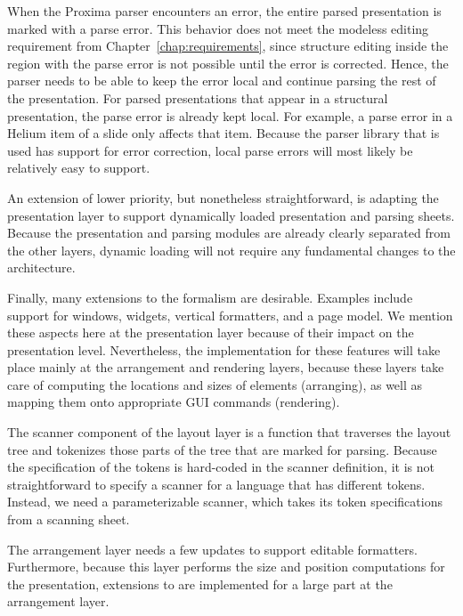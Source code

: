 When the Proxima parser encounters an error, the entire parsed presentation is marked with a parse error. This behavior does not meet the modeless editing requirement from Chapter~\ref{chap:requirements}, since structure editing inside the region with the parse error is not possible until the error is corrected. Hence, the parser needs to be able to keep the error local and continue parsing the rest of the presentation. For parsed presentations that appear in a structural presentation, the parse error is already kept local. For example, a parse error in a Helium item of a slide only affects that item. Because the parser library that is used has support for error correction, local parse errors will most likely be relatively easy to support. 


An extension of lower priority, but nonetheless straightforward, is adapting the presentation layer to support dynamically loaded presentation and parsing sheets. Because the presentation and parsing modules are already clearly separated from the other layers, dynamic loading will not require any fundamental changes to the architecture.

Finally, many extensions to the  formalism are desirable. Examples include support for windows, widgets, vertical formatters, and a page model. We mention these aspects here at the presentation layer because of their impact on the presentation level. Nevertheless, the implementation for these features will take place mainly at the arrangement and rendering layers, because these layers take care of computing the locations and sizes of {\Xprez} elements (arranging), as well as mapping them onto appropriate GUI commands (rendering).


The scanner component of the layout layer is a function that traverses the layout tree and tokenizes those parts of the tree that are marked for parsing. Because the specification of the tokens is hard-coded in the scanner definition, it is not straightforward to specify a scanner for a language that has different tokens. Instead, we need a parameterizable scanner, which takes its token specifications from a scanning sheet.


The arrangement layer needs a few updates to support editable formatters. Furthermore, because this layer performs the size and position computations for the presentation, extensions to {\Xprez} are implemented for a large part at the arrangement layer.

